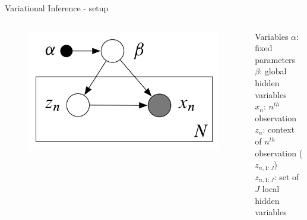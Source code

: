 \documentclass[aspectratio=169]{beamer}
\begin{document}
\begin{frame}{Variational Inference - setup}
    
    \begin{columns}
    \begin{column}{0.48\textwidth}
        \begin{figure}
        \includegraphics[width=\textwidth]{setup.png}\hspace*{12cm}
        \end{figure}
    \end{column}
    \begin{column}{0.48\textwidth}
        \begin{block}{Variables}
        $\alpha$: fixed parameters\\
        $\beta$: global hidden variables\\
        $x_n$: $n^{th}$ observation\\
        $z_n$: context of $n^{th}$ observation ($z_{n,1:J}$)\\
        $z_{n,1:J}$: set of $J$ local hidden variables 
        \end{block}
    \end{column}
    \end{columns}
\end{frame}
\end{document}
